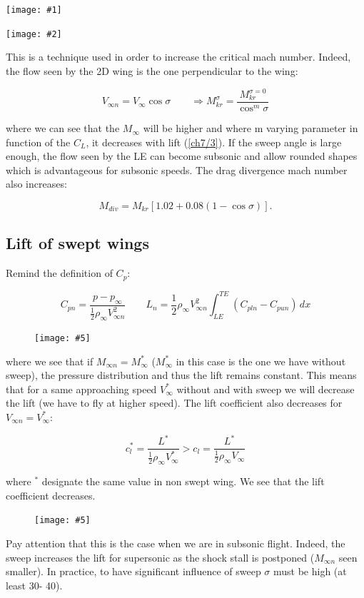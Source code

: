 \documentclass[british,french,11pt, a4paper, openany]{article}
\newcommand{\wrapfig}[6]{%
	\begin{figure}%
		\vspace{-5mm}%
		\texttt{[image: \#5]}%
		\captionof{figure}{}%
		\label{#6}%
	\end{figure}%
}
\newcommand{\minifig}[6]{
	\begin{center}%
		\begin{minipage}{#5\textwidth}%
			\texttt{[image: \#1]}%
			\captionof{figure}{}%
			\label{#1}%
		\end{minipage}%
		\begin{minipage}{#6\textwidth}%
			\texttt{[image: \#2]}%
			\captionof{figure}{}%
			\label{#2}%
		\end{minipage}%
	\end{center}
}
\begin{document}
\minifig{ch7/2}{ch7/3}{0.15}{0.15}{0.3}{0.3}
This is a technique used in order to increase the critical mach number. Indeed, the flow seen by the 2D wing is the one perpendicular to the wing:

\begin{equation}
V_{\infty n} = V_{\infty}\cos \sigma \qquad \Rightarrow M_{kr}^\sigma= \frac{M_{kr}^{\sigma = 0}}{\cos^m \sigma}
\end{equation}

where we can see that the $M_\infty$ will be higher and where m varying parameter in function of the $C_L$, it decreases with lift (\autoref{ch7/3}). If the sweep angle is large enough, the flow seen by the LE can become subsonic and allow rounded shapes which is advantageous for subsonic speeds. The drag divergence mach number also increases:

\begin{equation}
M_{div} = M_{kr} [1.02 + 0.08 (1-\cos \sigma)].
\end{equation}

\subsection{Lift of swept wings}
Remind the definition of $C_p$: 

\begin{equation}
C_{pn} = \frac{p-p_\infty}{\frac{1}{2} \rho _\infty V_{\infty n} ^2} \qquad L_n = \frac{1}{2}\rho _\infty V_{\infty n} ^2 \int _{LE} ^{TE} (C_{pln} - C_{pun}) \, dx 
\end{equation}

\wrapfig{11}{l}{4.5}{0.12}{ch7/4}{ch7/4}
where we see that if $M_{\infty n} = M_\infty^*$ ($M_\infty^*$ in this case is the one we have without sweep), the pressure distribution and thus the lift remains constant. This means that for a same approaching speed $V_\infty^*$ without and with sweep we will decrease the lift (we have to fly at higher speed). The lift coefficient also decreases for $V_{\infty n} = V_\infty^*$:

\begin{equation}
c_{l}^* = \frac{L^*}{\frac{1}{2}\rho _\infty V_{\infty}^*} > c_{l} = \frac{L^*}{\frac{1}{2}\rho _\infty V_{\infty}}
\end{equation}

where $^*$ designate the same value in non swept wing. We see that the lift coefficient decreases. 

\wrapfig{5}{l}{6}{0.15}{ch7/5}{ch7/5}
Pay attention that this is the case when we are in subsonic flight. Indeed, the sweep increases the lift for supersonic as the shock stall is postponed ($M_{\infty n}$ seen smaller). In practice, to have significant influence of sweep $\sigma$ must be high (at least 30\degres - 40\degres). 
\end{document}
